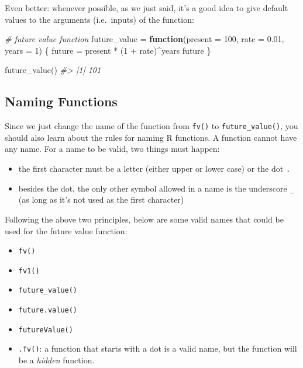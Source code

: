 \documentclass[
]{book}
\newenvironment{Shaded}{\begin{snugshade}}{\end{snugshade}}
\newcommand{\AttributeTok}[1]{\textcolor[rgb]{0.77,0.63,0.00}{#1}}
\newcommand{\CommentTok}[1]{\textcolor[rgb]{0.56,0.35,0.01}{\textit{#1}}}
\newcommand{\ControlFlowTok}[1]{\textcolor[rgb]{0.13,0.29,0.53}{\textbf{#1}}}
\newcommand{\DecValTok}[1]{\textcolor[rgb]{0.00,0.00,0.81}{#1}}
\newcommand{\FloatTok}[1]{\textcolor[rgb]{0.00,0.00,0.81}{#1}}
\newcommand{\FunctionTok}[1]{\textcolor[rgb]{0.00,0.00,0.00}{#1}}
\newcommand{\NormalTok}[1]{#1}
\newcommand{\OtherTok}[1]{\textcolor[rgb]{0.56,0.35,0.01}{#1}}
\newcommand{\SpecialCharTok}[1]{\textcolor[rgb]{0.00,0.00,0.00}{#1}}
\begin{document}
Even better: whenever possible, as we just said, it's a good idea to give
default values to the arguments (i.e.~inputs) of the function:

\begin{Shaded}
\begin{Highlighting}[]
\CommentTok{\# future value function}
\NormalTok{future\_value }\OtherTok{=} \ControlFlowTok{function}\NormalTok{(}\AttributeTok{present =} \DecValTok{100}\NormalTok{, }\AttributeTok{rate =} \FloatTok{0.01}\NormalTok{, }\AttributeTok{years =} \DecValTok{1}\NormalTok{) \{}
\NormalTok{  future }\OtherTok{=}\NormalTok{ present }\SpecialCharTok{*}\NormalTok{ (}\DecValTok{1} \SpecialCharTok{+}\NormalTok{ rate)}\SpecialCharTok{\^{}}\NormalTok{years}
\NormalTok{  future}
\NormalTok{\}}

\FunctionTok{future\_value}\NormalTok{()}
\CommentTok{\#\textgreater{} [1] 101}
\end{Highlighting}
\end{Shaded}

\hypertarget{naming-functions}{%
\subsection{Naming Functions}\label{naming-functions}}

Since we just change the name of the function from \texttt{fv()} to \texttt{future\_value()},
you should also learn about the rules for naming R functions. A function cannot
have any name. For a name to be valid, two things must happen:

\begin{itemize}
\item
  the first character must be a letter (either upper or lower case) or the
  dot \texttt{.}
\item
  besides the dot, the only other symbol allowed in a name is the underscore
  \texttt{\_} (as long as it's not used as the first character)
\end{itemize}

Following the above two principles, below are some valid names that could be
used for the future value function:

\begin{itemize}
\item
  \texttt{fv()}
\item
  \texttt{fv1()}
\item
  \texttt{future\_value()}
\item
  \texttt{future.value()}
\item
  \texttt{futureValue()}
\item
  \texttt{.fv()}: a function that starts with a dot is a valid name, but the
  function will be a \emph{hidden} function.
\end{itemize}
\end{document}
